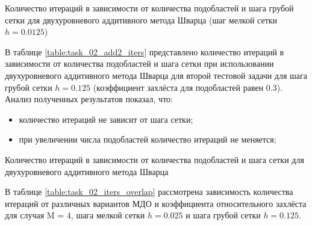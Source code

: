 \documentclass[a4paper]{article}
\begin{document}
\newpage

\begin{table}[h]
\caption{Количество итераций в зависимости от количества подобластей и шага грубой сетки для двухуровневого аддитивного метода Шварца (шаг мелкой сетки $h = 0.0125$)}
\label{table:task_02_add2_coarse}
\end{table}

В таблице \ref{table:task_02_add2_iters} представлено количество итераций в зависимости от количества подобластей и шага сетки при использовании двухуровневого аддитивного метода Шварца для второй тестовой задачи для шага грубой сетки $h = 0.125$ (коэффициент захлёста для подобластей равен 0.3). Анализ полученных результатов показал, что:
\begin{itemize}
\item количество итераций не зависит от шага сетки;
\item при увеличении числа подобластей количество итераций не меняется;
\end{itemize}

\begin{table}[h]
\caption{Количество итераций в зависимости от количества подобластей и шага сетки для двухуровневого аддитивного метода Шварца}
\label{table:task_02_add2_iters}
\end{table}

В таблице \ref{table:task_02_iters_overlap} рассмотрена зависимость количества итераций от различных вариантов МДО и коэффициента относительного захлёста для случая M = 4, шага мелкой сетки $h = 0.025$ и шага грубой сетки $h = 0.125$. 
\end{document}
